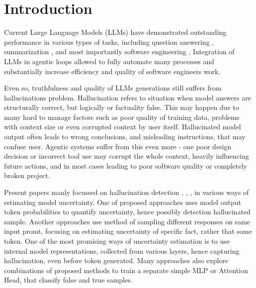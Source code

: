 \section{Introduction} 
Current Large Language Models (LLMs) have demonstrated outstanding performance
in various types of tasks, including question answering \cite{muludi2024retrieval}, summarization \cite{pu2023summarization}, and most
importantly software engineering \cite{zhang2026survey}. Integration of LLMs in agentic loops allowed 
to fully automate many processes and substantially increase efficiency and quality
of software engineers work.

Even so, truthfulness and quality of LLMs generations still suffers from hallucinations problem.
Hallucination refers to situation when model answers are structurally correct, but logically or 
factuality false. This may happen due to many hard to manage factors \cite{huang2025survey} such as poor quality of training
data, problems with context size or even corrupted context by user itself. Hallucinated
model output often leads to wrong conclusions, and misleading instructions,
that may confuse user. Agentic systems suffer from this even more - one poor design decision or incorrect tool
use may corrupt the whole context, heavily influencing future actions, and in most cases leading to poor software
quality or completely broken project.

Present papers manly focussed on hallucination detection \cite{azaria2023internalstatellmknows}, \cite{zhang2025icr}, \cite{shelmanov2025head}, \cite{fadeeva2024fact} in various ways of estimating 
model uncertainty. One of proposed approaches uses model output token probabilities to quantify 
uncertainty, hence possibly detection hallucinated sample. Another approaches use method of sampling
different responses on same input promt, focusing on estimating uncertainty of specific fact,
rather that some token. One of the most promising ways of uncertainty estimation is to use internal
model representations, collected from various layers, hence capturing hallucination, even before token generated.
Many approaches also explore combinations of proposed methods to train a separate simple MLP or Attention Head, that
classify false and true samples.


